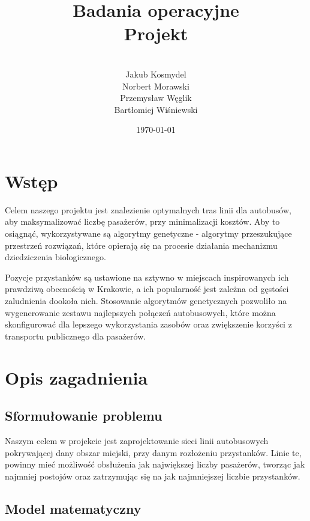 \documentclass[12pt,a4paper,openright]{mwrep}
\begin{document}
\title{
    Badania operacyjne\\
    Projekt\\
}

\author{\\Jakub Kosmydel\\Norbert Morawski
    \\Przemysław Węglik\\Bartłomiej Wiśniewski}

\date{\today}

\maketitle
\tableofcontents

\chapter{Wstęp}
Celem naszego projektu jest znalezienie optymalnych tras linii dla autobusów, aby maksymalizować liczbę pasażerów, przy minimalizacji kosztów. Aby to osiągnąć, wykorzystywane są algorytmy genetyczne -  algorytmy przeszukujące przestrzeń rozwiązań, które opierają się na procesie działania mechanizmu dziedziczenia biologicznego.


Pozycje przystanków są ustawione na sztywno w miejscach inspirowanych ich prawdziwą obecnością w Krakowie, a ich popularność jest zależna od gęstości zaludnienia dookoła nich. Stosowanie algorytmów genetycznych pozwoliło na wygenerowanie zestawu najlepszych połączeń autobusowych, które można skonfigurować dla lepszego wykorzystania zasobów oraz zwiększenie korzyści z transportu publicznego dla pasażerów.

\chapter{Opis zagadnienia}

\section{Sformułowanie problemu}
Naszym celem w projekcie jest zaprojektowanie sieci linii autobusowych pokrywającej dany obszar miejski, przy danym rozłożeniu przystanków. Linie te, powinny mieć możliwość obsłużenia jak największej liczby pasażerów, tworząc jak najmniej postojów oraz zatrzymując się na jak najmniejszej liczbie przystanków.

\section{Model matematyczny}
\end{document}
